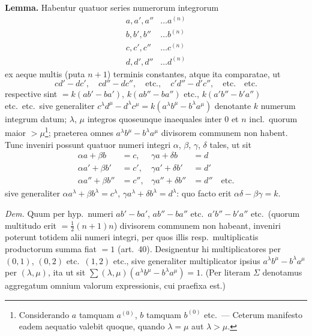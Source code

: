\documentclass[12pt,a4paper]{article}
\theoremstyle{plain}
\theoremstyle{definition}
\theoremstyle{remark}
\begin{document}
\textbf{Lemma.}
Habentur quatuor series numerorum integrorum
\begin{align*}
a, a', a''&\ldots a^{(n)} \\
b, b', b''&\ldots b^{(n)} \\
c, c', c''&\ldots c^{(n)} \\
d, d', d''&\ldots d^{(n)}
\end{align*}
ex aeque multis (puta $n+1$) terminis constantes, atque ita comparatae, ut
\[
cd'-dc',\quad cd''-dc'',\quad\text{etc.},\quad c'd''-d'c'',\quad\text{etc.}\quad\text{etc.}
\]
respective sint $=k(ab'-ba')$, $k(ab''-ba'')$ etc., $k(a'b''-b'a'')$ etc.\ etc.\ sive generaliter $c^\lambda d^\mu - d^\lambda c^\mu = k(a^\lambda b^\mu - b^\lambda a^\mu)$ denotante $k$ numerum integrum datum; $\lambda$, $\mu$ integros quoseunque inaequales inter $0$ et $n$ incl.\ quorum maior $>\mu$\footnote{Considerando $a$ tamquam $a^{(0)}$, $b$ tamquam $b^{(0)}$ etc.\ --- Ceterum manifesto eadem aequatio valebit quoque, quando $\lambda=\mu$ aut $\lambda>\mu$.}; praeterea omnes $a^\lambda b^\mu - b^\lambda a^\mu$ divisorem communem non habent. Tunc inveniri possunt quatuor numeri integri $\alpha$, $\beta$, $\gamma$, $\delta$ tales, ut sit
\begin{align*}
\alpha a + \beta b &= c, & \gamma a + \delta b &= d \\
\alpha a' + \beta b' &= c', & \gamma a' + \delta b' &= d' \\
\alpha a'' + \beta b'' &= c'', & \gamma a'' + \delta b'' &= d''\quad\text{etc.}
\end{align*}
sive generaliter $\alpha a^\lambda + \beta b^\lambda = c^\lambda$, $\gamma a^\lambda + \delta b^\lambda = d^\lambda$: quo facto erit $\alpha\delta - \beta\gamma = k$.

\textit{Dem.}
Quum per hyp.\ numeri $ab'-ba'$, $ab''-ba''$ etc.\ $a'b''-b'a''$ etc.\ (quorum multitudo erit $=\frac{1}{2}(n+1)n$) divisorem communem non habeant, inveniri poterunt totidem alii numeri integri, per quos illis resp.\ multiplicatis productorum summa fiat $=1$ (art.\ 40). Designentur hi multiplicatores per $(0,1)$, $(0,2)$ etc.\ $(1,2)$ etc., sive generaliter multiplicator ipsius $a^\lambda b^\mu - b^\lambda a^\mu$ per $(\lambda,\mu)$, ita ut sit $\sum(\lambda,\mu)(a^\lambda b^\mu - b^\lambda a^\mu) = 1$. (Per literam $\Sigma$ denotamus aggregatum omnium valorum expressionis, cui praefixa est.)
\end{document}
